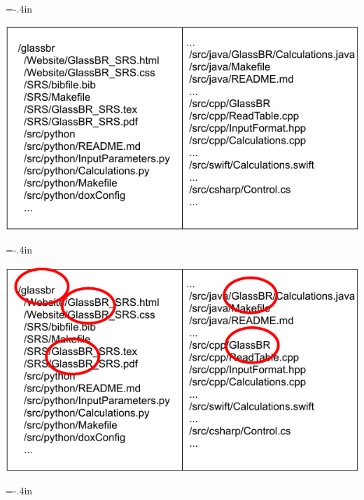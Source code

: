 \documentclass[usenames,dvipsnames]{beamer}
\begin{document}
\hoffset=0in %
\hoffset=-.4in %
\begin{frame}[plain]
  
  
  \includegraphics[width=1.05\textwidth]{FoldersFiles.pdf}
  
\end{frame}
\hoffset=0in %
\hoffset=-.4in %
\begin{frame}[plain]
  
  
  \includegraphics[width=1.05\textwidth]{FoldersFilesCircleGlassBR.pdf}
  
\end{frame}
\hoffset=0in %
\hoffset=-.4in %
\end{document}

